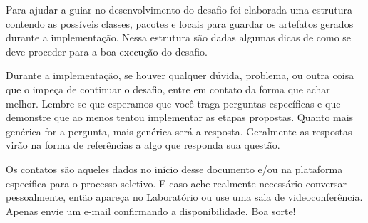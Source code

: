 \documentclass{article}
\begin{document}
Para ajudar a guiar no desenvolvimento do desafio foi elaborada uma estrutura
contendo as possíveis classes, pacotes e locais para guardar os artefatos
gerados durante a implementação. Nessa estrutura são dadas algumas dicas de
como se deve proceder para a boa execução do desafio.

Durante a implementação, se houver qualquer dúvida, problema, ou outra coisa
que o impeça de continuar o desafio, entre em contato da forma que achar
melhor. Lembre-se que esperamos que você traga perguntas específicas e que
demonstre que ao menos tentou implementar as etapas propostas. Quanto mais
genérica for a pergunta, mais genérica será a resposta. Geralmente as respostas
virão na forma de referências a algo que responda sua questão.

Os contatos são aqueles dados no início desse documento e/ou na plataforma
específica para o processo seletivo. E caso ache realmente necessário conversar
pessoalmente, então apareça no Laboratório ou use uma sala de
videoconferência. Apenas envie um e-mail confirmando a disponibilidade. Boa
sorte!



\end{document}
